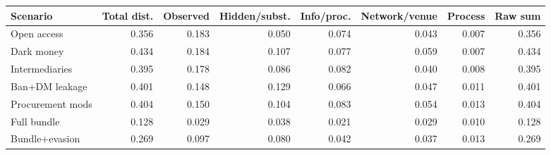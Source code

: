 \begingroup
\begin{center}
\begin{minipage}{\textwidth}
\centering
\scriptsize
\setlength{\tabcolsep}{1pt}
\begin{tabular*}{\textwidth}{@{\extracolsep{\fill}}lrrrrrrr@{}}
\toprule
Scenario & Total dist. & Observed & Hidden/subst. & Info/proc. & Network/venue & Process & Raw sum \\
\midrule
Open access & 0.356 & 0.183 & 0.050 & 0.074 & 0.043 & 0.007 & 0.356 \\
Dark money & 0.434 & 0.184 & 0.107 & 0.077 & 0.059 & 0.007 & 0.434 \\
Intermediaries & 0.395 & 0.178 & 0.086 & 0.082 & 0.040 & 0.008 & 0.395 \\
Ban+DM leakage & 0.401 & 0.148 & 0.129 & 0.066 & 0.047 & 0.011 & 0.401 \\
Procurement mods & 0.404 & 0.150 & 0.104 & 0.083 & 0.054 & 0.013 & 0.404 \\
Full bundle & 0.128 & 0.029 & 0.038 & 0.021 & 0.029 & 0.010 & 0.128 \\
Bundle+evasion & 0.269 & 0.097 & 0.080 & 0.042 & 0.037 & 0.013 & 0.269 \\
\bottomrule
\end{tabular*}
\par\smallskip
\captionsetup{hypcap=false}
\label{tab:distortion-decomposition}
\end{minipage}
\end{center}
\endgroup
